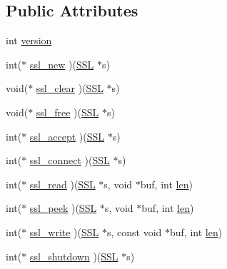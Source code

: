 \subsection*{Public Attributes}
\begin{DoxyCompactItemize}
\item 
int \hyperlink{structssl__method__st_a1d231051899c943c03267d9ede6d2488}{version}
\item 
int($\ast$ \hyperlink{structssl__method__st_a7a5b5fc62a1f2d1e130bb67f5da66a81}{ssl\+\_\+new} )(\hyperlink{ossl__typ_8h_a71f21e09bf365489dab9d85bd4785e24}{S\+SL} $\ast$s)
\item 
void($\ast$ \hyperlink{structssl__method__st_ae1a1f21bb25134669738357096bfd629}{ssl\+\_\+clear} )(\hyperlink{ossl__typ_8h_a71f21e09bf365489dab9d85bd4785e24}{S\+SL} $\ast$s)
\item 
void($\ast$ \hyperlink{structssl__method__st_a8df364610bd0f741b9fe078a69d88e28}{ssl\+\_\+free} )(\hyperlink{ossl__typ_8h_a71f21e09bf365489dab9d85bd4785e24}{S\+SL} $\ast$s)
\item 
int($\ast$ \hyperlink{structssl__method__st_a414ff7e2c280fb8e5cee22bff2df8717}{ssl\+\_\+accept} )(\hyperlink{ossl__typ_8h_a71f21e09bf365489dab9d85bd4785e24}{S\+SL} $\ast$s)
\item 
int($\ast$ \hyperlink{structssl__method__st_acfec7986091a9749de81345a3833b595}{ssl\+\_\+connect} )(\hyperlink{ossl__typ_8h_a71f21e09bf365489dab9d85bd4785e24}{S\+SL} $\ast$s)
\item 
int($\ast$ \hyperlink{structssl__method__st_a113246b4c830059207f54935b8874289}{ssl\+\_\+read} )(\hyperlink{ossl__typ_8h_a71f21e09bf365489dab9d85bd4785e24}{S\+SL} $\ast$s, void $\ast$buf, int \hyperlink{x509_8h_ad8c3db4434e9cb5cd772cc009f40e856}{len})
\item 
int($\ast$ \hyperlink{structssl__method__st_a4216ad37e9a089392b0fe1915ed745d7}{ssl\+\_\+peek} )(\hyperlink{ossl__typ_8h_a71f21e09bf365489dab9d85bd4785e24}{S\+SL} $\ast$s, void $\ast$buf, int \hyperlink{x509_8h_ad8c3db4434e9cb5cd772cc009f40e856}{len})
\item 
int($\ast$ \hyperlink{structssl__method__st_aeaa1745bfd8cea08b5d943fa49c1804a}{ssl\+\_\+write} )(\hyperlink{ossl__typ_8h_a71f21e09bf365489dab9d85bd4785e24}{S\+SL} $\ast$s, const void $\ast$buf, int \hyperlink{x509_8h_ad8c3db4434e9cb5cd772cc009f40e856}{len})
\item 
int($\ast$ \hyperlink{structssl__method__st_a7dc97d1a59c10baa705a23e5aa4f7546}{ssl\+\_\+shutdown} )(\hyperlink{ossl__typ_8h_a71f21e09bf365489dab9d85bd4785e24}{S\+SL} $\ast$s)

\end{DoxyCompactItemize}
